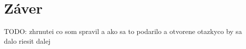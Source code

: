 \chapter{Záver}

TODO: zhrnutei co som spravil a ako sa to podarilo a otvorene otazkyco by sa dalo riesit dalej
